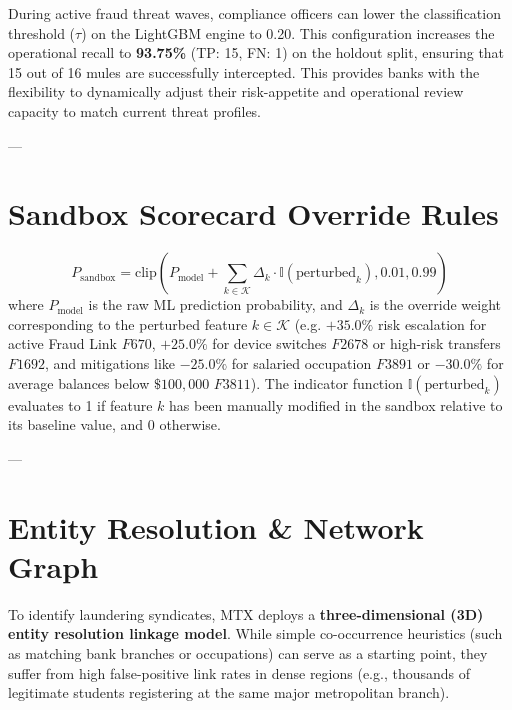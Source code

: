 \documentclass[11pt,a4paper]{article}
\begin{document}
During active fraud threat waves, compliance officers can lower the classification threshold ($\tau$) on the LightGBM engine to 0.20. This configuration increases the operational recall to \textbf{93.75\%} (TP: 15, FN: 1) on the holdout split, ensuring that 15 out of 16 mules are successfully intercepted. This provides banks with the flexibility to dynamically adjust their risk-appetite and operational review capacity to match current threat profiles.

---

\section{Sandbox Scorecard Override Rules}
\begin{equation}
P_{\text{sandbox}} = \text{clip}\left(P_{\text{model}} + \sum_{k \in \mathcal{K}} \Delta_k \cdot \mathbb{I}(\text{perturbed}_k), 0.01, 0.99\right)
\end{equation}
where $P_{\text{model}} $ is the raw ML prediction probability, and $\Delta_k$ is the override weight corresponding to the perturbed feature $k \in \mathcal{K}$ (e.g. $+35.0\%$ risk escalation for active Fraud Link $F670$, $+25.0\%$ for device switches $F2678$ or high-risk transfers $F1692$, and mitigations like $-25.0\%$ for salaried occupation $F3891$ or $-30.0\%$ for average balances below $\$100,000$ $F3811$). The indicator function $\mathbb{I}(\text{perturbed}_k)$ evaluates to 1 if feature $k$ has been manually modified in the sandbox relative to its baseline value, and 0 otherwise.

---

\section{Entity Resolution \& Network Graph}
To identify laundering syndicates, MTX deploys a \textbf{three-dimensional (3D) entity resolution linkage model}. While simple co-occurrence heuristics (such as matching bank branches or occupations) can serve as a starting point, they suffer from high false-positive link rates in dense regions (e.g., thousands of legitimate students registering at the same major metropolitan branch). 
\end{document}
